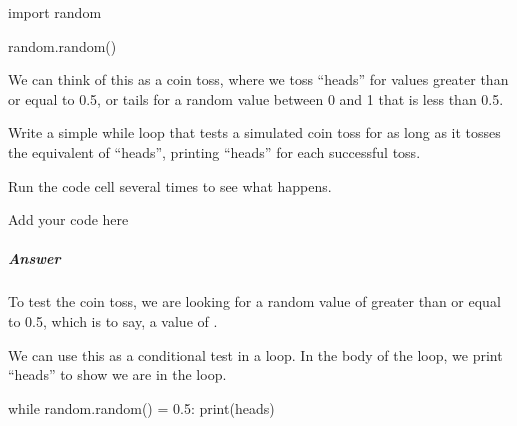 \documentclass[letterpaper,10pt,english]{sphinxmanual}
\begin{document}
{
\begin{sphinxVerbatim}[commandchars=\\\{\}]
\llap{\color{nbsphinxin}[ ]:\,\hspace{\fboxrule}\hspace{\fboxsep}}import random

random.random()
\end{sphinxVerbatim}
}

We can think of this as a coin toss, where we toss “heads” for values greater than or equal to 0.5, or tails for a random value between 0 and 1 that is less than 0.5.

Write a simple while loop that tests a simulated coin toss for as long as it tosses the equivalent of “heads”, printing “heads” for each successful toss.

Run the code cell several times to see what happens.

{
\begin{sphinxVerbatim}[commandchars=\\\{\}]
\llap{\color{nbsphinxin}[ ]:\,\hspace{\fboxrule}\hspace{\fboxsep}}\PYGZsh{} Add your code here
\end{sphinxVerbatim}
}


\subparagraph{Answer}
\label{\detokenize{content/02_Robot_Lab/Section_00_01:id4}}

To test the coin toss, we are looking for a random value of greater than or equal to 0.5, which is to say, a value of .

We can use this as a conditional test in a  loop. In the body of the loop, we print “heads” to show we are in the loop.

{
\begin{sphinxVerbatim}[commandchars=\\\{\}]
\llap{\color{nbsphinxin}[ ]:\,\hspace{\fboxrule}\hspace{\fboxsep}}while random.random() \PYGZgt{}= 0.5:
    print(\PYGZdq{}heads\PYGZdq{})
\end{sphinxVerbatim}
}
\end{document}
